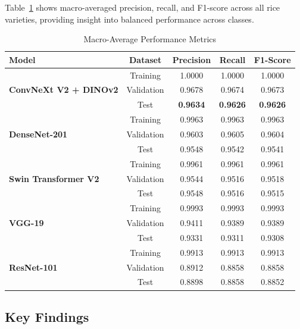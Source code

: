 \documentclass[11pt,a4paper]{article}
\begin{document}
Table~\ref{tab:macro} shows macro-averaged precision, recall, and F1-score across all rice varieties, providing insight into balanced performance across classes.

\begin{table}[H]
\centering
\caption{Macro-Average Performance Metrics}
\label{tab:macro}
\begin{tabular}{lcccc}
\toprule
\textbf{Model} & \textbf{Dataset} & \textbf{Precision} & \textbf{Recall} & \textbf{F1-Score} \\
\midrule
\multirow{3}{*}{\textbf{ConvNeXt V2 + DINOv2}}
& Training & 1.0000 & 1.0000 & 1.0000 \\
& Validation & 0.9678 & 0.9674 & 0.9673 \\
& Test & \textbf{0.9634} & \textbf{0.9626} & \textbf{0.9626} \\
\midrule
\multirow{3}{*}{\textbf{DenseNet-201}}
& Training & 0.9963 & 0.9963 & 0.9963 \\
& Validation & 0.9603 & 0.9605 & 0.9604 \\
& Test & 0.9548 & 0.9542 & 0.9541 \\
\midrule
\multirow{3}{*}{\textbf{Swin Transformer V2}}
& Training & 0.9961 & 0.9961 & 0.9961 \\
& Validation & 0.9544 & 0.9516 & 0.9518 \\
& Test & 0.9548 & 0.9516 & 0.9515 \\
\midrule
\multirow{3}{*}{\textbf{VGG-19}}
& Training & 0.9993 & 0.9993 & 0.9993 \\
& Validation & 0.9411 & 0.9389 & 0.9389 \\
& Test & 0.9331 & 0.9311 & 0.9308 \\
\midrule
\multirow{3}{*}{\textbf{ResNet-101}}
& Training & 0.9913 & 0.9913 & 0.9913 \\
& Validation & 0.8912 & 0.8858 & 0.8858 \\
& Test & 0.8898 & 0.8858 & 0.8852 \\
\bottomrule
\end{tabular}
\end{table}

\subsection{Key Findings}
\end{document}
